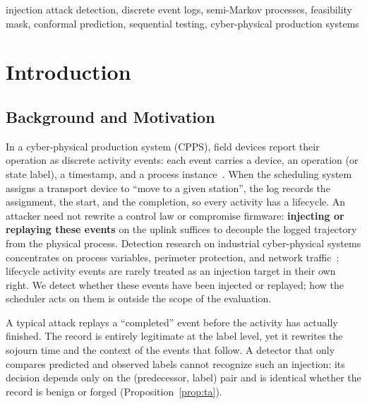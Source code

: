 \documentclass[manuscript,screen,review]{acmart}
\begin{document}

\begin{keywords}
injection attack detection, discrete event logs, semi-Markov processes, feasibility mask,
conformal prediction, sequential testing, cyber-physical production systems
\end{keywords}

\maketitle


\section{Introduction}
\label{sec:intro}

\subsection{Background and Motivation}
\label{sec:intro_bg}

In a cyber-physical production system (CPPS), field devices report their operation as discrete activity events: each event carries a device, an operation (or state label), a timestamp, and a process instance~\cite{monostori2016cpps,seiger2022factory}. When the scheduling system assigns a transport device to ``move to a given station'', the log records the assignment, the start, and the completion, so every activity has a lifecycle. An attacker need not rewrite a control law or compromise firmware: \textbf{injecting or replaying these events} on the uplink suffices to decouple the logged trajectory from the physical process. Detection research on industrial cyber-physical systems concentrates on process variables, perimeter protection, and network traffic~\cite{kayan2022icps}; lifecycle activity events are rarely treated as an injection target in their own right. We detect whether these events have been injected or replayed; how the scheduler acts on them is outside the scope of the evaluation.

A typical attack replays a ``completed'' event before the activity has actually finished. The record is entirely legitimate at the label level, yet it rewrites the sojourn time and the context of the events that follow. A detector that only compares predicted and observed labels cannot recognize such an injection: its decision depends only on the (predecessor, label) pair and is identical whether the record is benign or forged (Proposition~\ref{prop:ta}).
\end{document}
